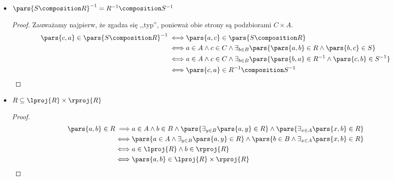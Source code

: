 \begin{description}
\begin{itemize}
\begin{proof}
\begin{equation*}
\begin{split}
                                \iff& \pars{a, d} \in \pars{T \composition S} \composition R
                        \end{split}
                    \end{equation*}
                \end{proof}
            \item \(\pars{S \composition R}^{-1} = R^{-1} \composition S^{-1}\)
                \begin{proof}
                    Zauważamy najpierw, że zgadza się ,,typ'', ponieważ obie strony są podzbiorami \(C \times A\).
                    \begin{equation*}
                        \begin{split}
                            \pars{c, a} \in \pars{S \composition R}^{-1}
                                \iff& \pars{a, c} \in \pars{S \composition R}\\
                                \iff& a \in A \land c \in C \land \exists_{b \in B} \pars{\pars{a, b} \in R \land \pars{b, c} \in S}\\
                                \iff& a \in A \land c \in C \land \exists_{b \in B} \pars{\pars{b, a} \in R^{-1} \land \pars{c, b} \in S^{-1}}\\
                                \iff& \pars{c, a} \in R^{-1} \composition S^{-1}
                        \end{split}
                    \end{equation*}
                \end{proof}
            \item \(R \subseteq \lproj{R} \times \rproj{R}\)
                \begin{proof}
                    \begin{equation*}
                        \begin{split}
                            \pars{a, b} \in R
                                \implies& a \in A \land b \in B \land \pars{\exists_{y \in B} \pars{a, y} \in R} \land \pars{\exists_{x \in A} \pars{x, b} \in R}\\
                                \iff& \pars{a \in A \land \exists_{y \in B} \pars{a, y} \in R} \land \pars{b \in B \land \exists_{x \in A} \pars{x, b} \in R}\\
                                \iff& a \in \lproj{R} \land b \in \rproj{R}\\
                                \iff& \pars{a, b} \in \lproj{R} \times \rproj{R}

\end{split}
\end{equation*}
\end{proof}
\end{itemize}
\end{description}
